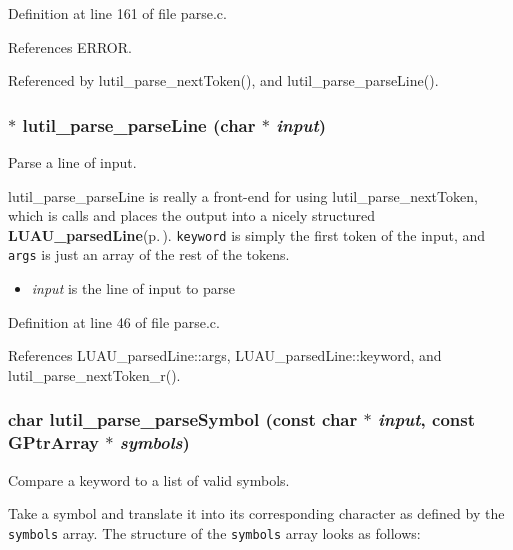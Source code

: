 Definition at line 161 of file parse.c.

References ERROR.

Referenced by lutil\_\-parse\_\-next\-Token(), and lutil\_\-parse\_\-parse\-Line().
\subsubsection{$\ast$ lutil\_\-parse\_\-parse\-Line (char $\ast$ {\em input})}\label{parse_8c_a0}


Parse a line of input. 

lutil\_\-parse\_\-parse\-Line is really a front-end for using lutil\_\-parse\_\-next\-Token, which is calls and places the output into a nicely structured {\bf LUAU\_\-parsed\-Line}{\rm (p.\,\pageref{structLUAU__parsedLine})}. {\tt keyword} is simply the first token of the input, and {\tt args} is just an array of the rest of the tokens.

\begin{itemize}
\item {\em input\/} is the line of input to parse 
\end{itemize}


Definition at line 46 of file parse.c.

References LUAU\_\-parsed\-Line::args, LUAU\_\-parsed\-Line::keyword, and lutil\_\-parse\_\-next\-Token\_\-r().
\subsubsection{\setlength{\rightskip}{0pt plus 5cm}char lutil\_\-parse\_\-parse\-Symbol (const char $\ast$ {\em input}, const GPtr\-Array $\ast$ {\em symbols})}\label{parse_8c_a1}


Compare a keyword to a list of valid symbols. 

Take a symbol and translate it into its corresponding character as defined by the {\tt symbols} array. The structure of the {\tt symbols} array looks as follows: 

